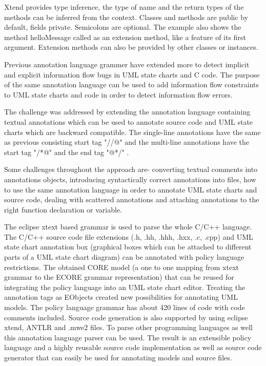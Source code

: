 Xtend provides type inference, the type of name and the return types of the methods can be inferred from the context. Classes and methods are public by default, fields private. Semicolons are optional. The example also shows the method helloMessage called as an extension method, like a feature of its first argument. Extension methods can also be provided by other classes or instances.


Previous annotation language grammer have extended more
to detect implicit and explicit information flow bugs in UML
state charts and C code. The purpose of the same annotation language
can be used to add information flow constraints to UML state
charts and code in order to detect information flow errors.

The challenge was addressed by extending the annotation language containing textual annotations which can be used to annotate source code and UML state charts which are backward compatible. The single-line annotations have the same as previous consisting start tag "//@" and the multi-line annotations have the start tag "/*@" and the end tag "@*/" .

Some challenges throughout the approach are- converting textual
comments into annotations objects, introducing syntactically
correct annotations into files, how to use the same annotation
language in order to annotate UML state charts and source
code, dealing with scattered annotations and attaching annotations to the right function declaration or variable.

The eclipse xtext based grammar is used to parse the whole C/C++ language. The C/C++ source code file extensions (.h, .hh, .hhh, .hxx, .c, .cpp) and UML state chart annotation box (graphical boxes
which can be attached to different parts of a UML state chart diagram) can be annotated with policy language restrictions. The obtained CORE model (a one to one mapping from xtext grammar to the ECORE grammar representation) that can be reused for integrating the policy language into an UML state chart editor. Treating the annotation tags as EObjects created new possibilities for annotating
UML models. The policy language grammar has about 420 lines of code with code comments included. Source code generation is also supported by using
eclipse xtend, ANTLR and .mwe2 files. To parse other programming languages as well this annotation language parser can be used. The result is an extensible policy language and a highly reusable source code implementation as well as source code generator that can easily be used for annotating models and source files.

